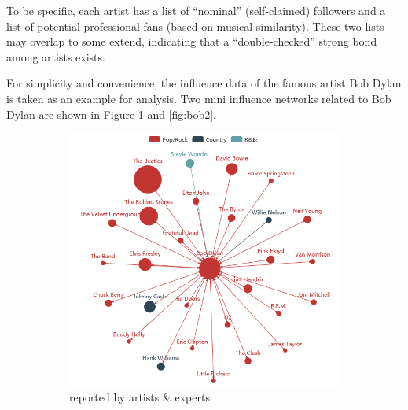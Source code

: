 To be specific, each artist has a list of ``nominal'' (self-claimed) followers and a list of potential professional fans (based on musical similarity). These two lists may overlap to some extend, indicating that a ``double-checked'' strong bond among artists exists.

For simplicity and convenience, the influence data of the famous artist Bob Dylan is taken as an example for analysis. Two mini influence networks related to Bob Dylan are shown in Figure \ref{fig:bob1} and \ref{fig:bob2}.

\begin{figure}[htbp]
    \setlength{\leftskip}{0pt plus 1fil minus \marginparwidth}
    \setlength{\rightskip}{\leftskip}
    \begin{subfigure}{0.5\linewidth}
        \centering
        \includegraphics[width=\textwidth]{figures/xdq/BOB1.png}
        \caption{reported by artists \& experts}
        \label{fig:bob1}
    \end{subfigure}
    \begin{subfigure}{0.5\linewidth}
        \centering

\end{subfigure}
\end{figure}
